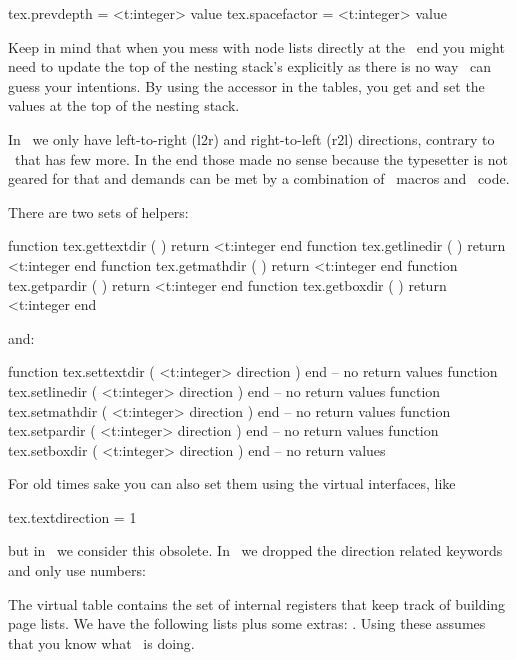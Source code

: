 \starttyping
tex.prevdepth   = <t:integer> value
tex.spacefactor = <t:integer> value
\stoptyping

Keep in mind that when you mess with node lists directly at the \LUA\ end you
might need to update the top of the nesting stack's \type {\prevdepth} explicitly
as there is no way \LUATEX\ can guess your intentions. By using the accessor in
the  tables, you get and set the values at the top of the nesting
stack.

\stopsubsection

\startsubsection[title={Directions}]

In \LUAMETATEX\ we only have left-to-right (l2r) and right-to-left (r2l)
directions, contrary to \LUATEX\ that has few more. In the end those made no
sense because the typesetter is not geared for that and demands can be met by a
combination of \TEX\ macros and \LUA\ code.

There are two sets of helpers:

\starttyping[option=LUA]
function tex.gettextdir ( ) return <t:integer end
function tex.getlinedir ( ) return <t:integer end
function tex.getmathdir ( ) return <t:integer end
function tex.getpardir  ( ) return <t:integer end
function tex.getboxdir  ( ) return <t:integer end
\stoptyping

and:

\starttyping[option=LUA]
function tex.settextdir ( <t:integer> direction ) end -- no return values
function tex.setlinedir ( <t:integer> direction ) end -- no return values
function tex.setmathdir ( <t:integer> direction ) end -- no return values
function tex.setpardir  ( <t:integer> direction ) end -- no return values
function tex.setboxdir  ( <t:integer> direction ) end -- no return values
\stoptyping

For old times sake you can also set them using the virtual interfaces, like

\starttyping[option=LUA]
tex.textdirection = 1
\stoptyping

but in \CONTEXT\ we consider this obsolete. In \LUAMETATEX\ we dropped the
direction related keywords and only use numbers:


\stopsubsection

\startsubsection[title={Special lists}]

The virtual table  contains the set of internal registers that
keep track of building page lists. We have the following lists plus some extras:
. Using these assumes that you know what
\TEX\ is doing.

